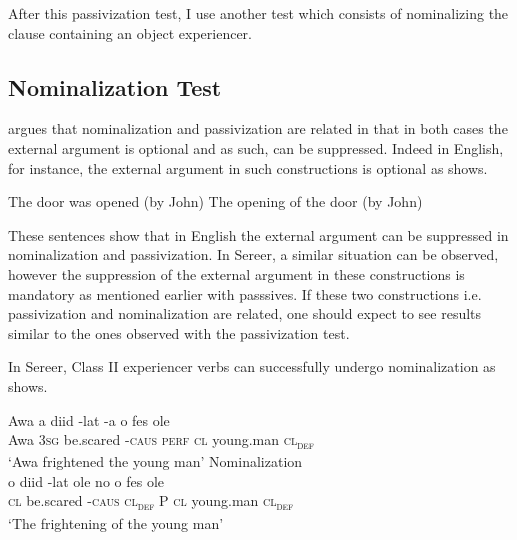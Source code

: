 \documentclass[output=paper]{langscibook}
\begin{document}
\ea \label{ex:tamba:12}
 \label{ex:tamba:12a}
 \label{ex:tamba:12b}
\z
\z

After this passivization test, I use another test which consists of nominalizing the clause containing an object experiencer. 

\subsection{Nominalization Test}

\citet{Grimshaw1990} argues that nominalization and passivization are related in that in both cases the external argument is optional and as such, can be suppressed. Indeed in English, for instance, the external argument in such constructions is optional as  shows.

\ea \label{ex:tamba:13}
\ea
The door was opened (by John)
\ex 
The opening of the door (by John)
\z
\z

These sentences show that in English the external argument can be suppressed in nominalization and passivization. In Sereer, a similar situation can be observed, however the suppression of the external argument in these constructions is mandatory as mentioned earlier with passsives. If these two constructions i.e. passivization and nominalization are related, one should expect to see results similar to the ones observed with the passivization test. 

In Sereer, Class II experiencer verbs can successfully undergo nominalization as  shows. 

\ea \label{ex:tamba:14}
\ea \label{ex:tamba:14a}
\gll Awa   a    diid          {}-lat    -a      o   fes            ole\\
Awa  \textsc{3sg} be.scared -\textsc{caus} \textsc{perf}  \textsc{cl} young.man \textsc{cl\textsubscript{def}}\\
\glt `Awa frightened the young man'
\ex Nominalization\\ \label{ex:tamba:14b}
\gll o   diid   -lat   ole      no o    fes       ole\\
\textsc{cl} be.scared   -\textsc{caus}  \textsc{cl\textsubscript{def}}  P  \textsc{cl} young.man    \textsc{cl\textsubscript{def}}\\
\glt `The frightening of the young man'
\z
\z
\end{document}
